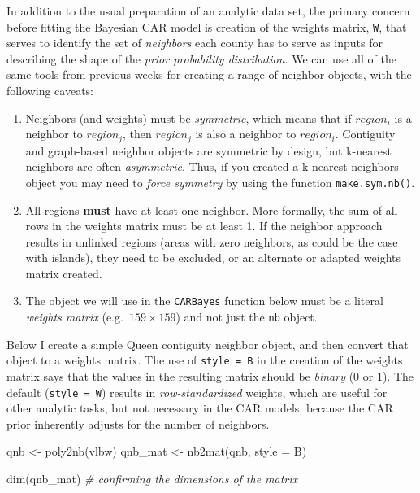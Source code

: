 \documentclass[
]{book}
\newenvironment{Shaded}{\begin{snugshade}}{\end{snugshade}}
\newcommand{\AttributeTok}[1]{\textcolor[rgb]{0.77,0.63,0.00}{#1}}
\newcommand{\CommentTok}[1]{\textcolor[rgb]{0.56,0.35,0.01}{\textit{#1}}}
\newcommand{\FunctionTok}[1]{\textcolor[rgb]{0.00,0.00,0.00}{#1}}
\newcommand{\NormalTok}[1]{#1}
\newcommand{\OtherTok}[1]{\textcolor[rgb]{0.56,0.35,0.01}{#1}}
\newcommand{\StringTok}[1]{\textcolor[rgb]{0.31,0.60,0.02}{#1}}
\providecommand{\tightlist}{%
  \setlength{\itemsep}{0pt}\setlength{\parskip}{0pt}}
\begin{document}
In addition to the usual preparation of an analytic data set, the primary concern before fitting the Bayesian CAR model is creation of the weights matrix, \texttt{W}, that serves to identify the set of \emph{neighbors} each county has to serve as inputs for describing the shape of the \emph{prior probability distribution}. We can use all of the same tools from previous weeks for creating a range of neighbor objects, with the following caveats:

\begin{enumerate}
\def\labelenumi{\arabic{enumi}.}
\tightlist
\item
  Neighbors (and weights) must be \emph{symmetric}, which means that if \(region_i\) is a neighbor to \(region_j\), then \(region_j\) is also a neighbor to \(region_i\). Contiguity and graph-based neighbor objects are symmetric by design, but k-nearest neighbors are often \emph{asymmetric}. Thus, if you created a k-nearest neighbors object you may need to \emph{force symmetry} by using the function \texttt{make.sym.nb()}.
\item
  All regions \textbf{must} have at least one neighbor. More formally, the sum of all rows in the weights matrix must be at least 1. If the neighbor approach results in unlinked regions (areas with zero neighbors, as could be the case with islands), they need to be excluded, or an alternate or adapted weights matrix created.
\item
  The object we will use in the \texttt{CARBayes} function below must be a literal \emph{weights matrix} (e.g.~\(159 \times 159\)) and not just the \texttt{nb} object.
\end{enumerate}

Below I create a simple Queen contiguity neighbor object, and then convert that object to a weights matrix. The use of \texttt{style\ =\ \textquotesingle{}B\textquotesingle{}} in the creation of the weights matrix says that the values in the resulting matrix should be \emph{binary} (0 or 1). The default (\texttt{style\ =\ \textquotesingle{}W\textquotesingle{}}) results in \emph{row-standardized} weights, which are useful for other analytic tasks, but not necessary in the CAR models, because the CAR prior inherently adjusts for the number of neighbors.

\begin{Shaded}
\begin{Highlighting}[]
\NormalTok{qnb }\OtherTok{\textless{}{-}} \FunctionTok{poly2nb}\NormalTok{(vlbw)}
\NormalTok{qnb\_mat }\OtherTok{\textless{}{-}} \FunctionTok{nb2mat}\NormalTok{(qnb, }\AttributeTok{style =} \StringTok{\textquotesingle{}B\textquotesingle{}}\NormalTok{)}

\FunctionTok{dim}\NormalTok{(qnb\_mat)  }\CommentTok{\# confirming the dimensions of the matrix}
\end{Highlighting}
\end{Shaded}
\end{document}
